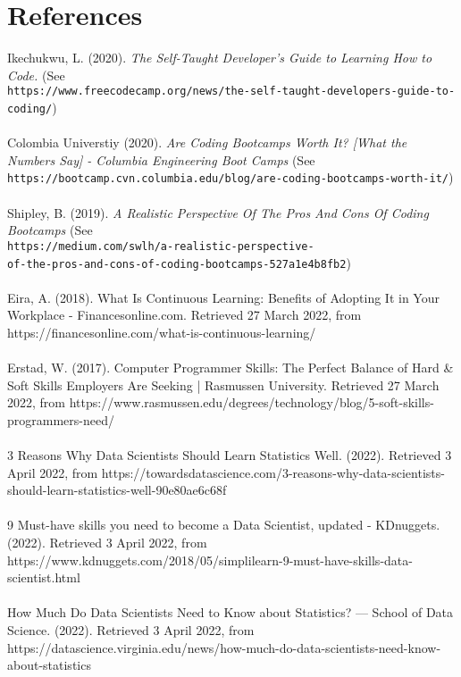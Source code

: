 \documentclass[a4paper, 11pt]{report}
\begin{document}
	\section{References}
	Ikechukwu, L. (2020). \textit{The Self-Taught Developer's Guide to Learning How to Code.} (See\\ \texttt{https://www.freecodecamp.org/news/the-self-taught-developers-guide-to-coding/})
	\\
	\\
	Colombia Universtiy (2020). \textit{Are Coding Bootcamps Worth It? [What the Numbers Say] - Columbia Engineering Boot Camps} (See\\ \texttt{https://bootcamp.cvn.columbia.edu/blog/are-coding-bootcamps-worth-it/}) 
	\\
	\\
	Shipley, B. (2019). \textit{A Realistic Perspective Of The Pros And Cons Of Coding Bootcamps} (See\\ \texttt{https://medium.com/swlh/a-realistic-perspective-\\
		of-the-pros-and-cons-of-coding-bootcamps-527a1e4b8fb2}) 
	\\
	\\
	Eira, A. (2018). What Is Continuous Learning: Benefits of Adopting It in Your Workplace - Financesonline.com. Retrieved 27 March 2022, from https://financesonline.com/what-is-continuous-learning/
	\\
	\\
	Erstad, W. (2017). Computer Programmer Skills: The Perfect Balance of Hard \& Soft Skills Employers Are Seeking | Rasmussen University. Retrieved 27 March 2022, from https://www.rasmussen.edu/degrees/technology/blog/5-soft-skills-programmers-need/
	\\
	\\
	3 Reasons Why Data Scientists Should Learn Statistics Well. (2022). Retrieved 3 April 2022, from https://towardsdatascience.com/3-reasons-why-data-scientists-should-learn-statistics-well-90e80ae6c68f
	\\
	\\
	9 Must-have skills you need to become a Data Scientist, updated - KDnuggets. (2022). Retrieved 3 April 2022, from https://www.kdnuggets.com/2018/05/simplilearn-9-must-have-skills-data-scientist.html
	\\
	\\
	How Much Do Data Scientists Need to Know about Statistics? — School of Data Science. (2022). Retrieved 3 April 2022, from https://datascience.virginia.edu/news/how-much-do-data-scientists-need-know-about-statistics
\end{document}
